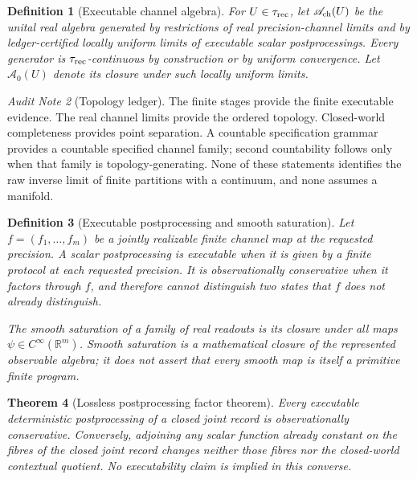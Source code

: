 \documentclass[11pt]{article}
\newtheorem{theorem}{Theorem}[section]
\newtheorem{definition}[theorem]{Definition}
\theoremstyle{remark}
\newtheorem{audit}[theorem]{Audit Note}
\begin{document}
\begin{definition}[Executable channel algebra]
\label{def:finite-record-algebra-topology}
For $U\in\tau_{\rm rec}$, let $\mathscr A_{\rm ch}(U)$ be the unital real
algebra generated by restrictions of real precision-channel limits and by
ledger-certified locally uniform limits of executable scalar postprocessings.
Every generator is $\tau_{\rm rec}$-continuous by construction or by uniform
convergence.  Let $\mathscr A_0(U)$ denote its closure under such locally
uniform limits.
\end{definition}

\begin{audit}[Topology ledger]
The finite stages provide the finite executable evidence.  The real channel
limits provide the ordered topology.  Closed-world completeness provides point
separation.  A countable specification grammar provides a countable specified channel family; second
countability follows only when that family is topology-generating.  None of these statements identifies the raw inverse limit of
finite partitions with a continuum, and none assumes a manifold.
\end{audit}

\begin{definition}[Executable postprocessing and smooth saturation]
\label{def:executable-vs-saturated}
Let $f=(f_1,\ldots,f_m)$ be a jointly realizable finite channel map at the requested precision.  A scalar
postprocessing is \emph{executable} when it is given by a finite protocol at
each requested precision.  It is \emph{observationally conservative} when it
factors through $f$, and therefore cannot distinguish two states that $f$
does not already distinguish.

The \emph{smooth saturation} of a family of real readouts is its closure under
all maps $\psi\in C^\infty(\mathbb R^m)$.  Smooth saturation is a mathematical
closure of the represented observable algebra; it does not assert that every
smooth map is itself a primitive finite program.
\end{definition}

\begin{theorem}[Lossless postprocessing factor theorem]
\label{thm:lossless-postprocessing-factor}
Every executable deterministic postprocessing of a closed joint record is
observationally conservative.  Conversely, adjoining any scalar function already constant on the fibres of the closed joint record changes neither those fibres nor the closed-world contextual quotient.  No executability claim is implied in this converse.
\end{theorem}
\end{document}
